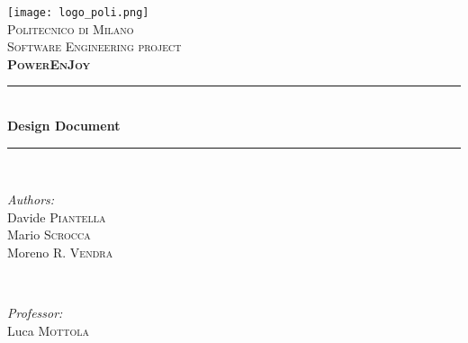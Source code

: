 \begin{titlepage}
\newcommand{\HRule}{\rule{\linewidth}{0.5mm}} %

\center %
 
\texttt{[image: logo\_poli.png]}\\[0.5cm] %
\textsc{\LARGE Politecnico di Milano}\\[2cm] %
\textsc{\Large Software Engineering  project}\\[0.5cm] %
\textsc{\large \textbf{PowerEnJoy}}\\[1.5cm] %


\HRule \\[0.4cm]
{ \huge \bfseries Design Document}\\[0.4cm] %
\HRule \\[1.5cm]
 

\begin{minipage}{0.4\textwidth}
\begin{flushleft} \large
\emph{Authors:}\\
Davide \textsc{Piantella}\\
Mario \textsc{Scrocca}\\
Moreno R. \textsc{Vendra} %
\end{flushleft}
\end{minipage}
~
\begin{minipage}{0.4\textwidth}
\begin{flushright} \large
\emph{Professor:} \\
Luca \textsc{Mottola} %
\end{flushright}
\end{minipage}\\[2cm]


\end{titlepage}

